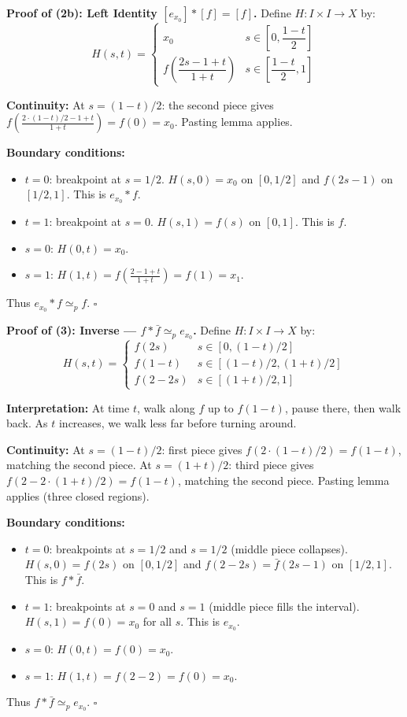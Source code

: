 \documentclass[11pt]{report}
\renewenvironment{proof}[1][Proof]{\noindent\textbf{#1.} }{\hfill$\square$\par\vspace{5pt}}
\begin{document}
\begin{proof}[{Proof of (2b): Left Identity $[e_{x_0}] * [f] = [f]$}]
Define $H: I \times I \to X$ by:
\[H(s, t) = \begin{cases} x_0 & s \in \left[0, \dfrac{1-t}{2}\right] \\[6pt] f\!\left(\dfrac{2s - 1 + t}{1 + t}\right) & s \in \left[\dfrac{1-t}{2}, 1\right] \end{cases}\]

\textbf{Continuity:} At $s = (1-t)/2$: the second piece gives $f\!\left(\frac{2 \cdot (1-t)/2 - 1 + t}{1+t}\right) = f(0) = x_0$. Pasting lemma applies.

\textbf{Boundary conditions:}
\begin{itemize}[nosep]
    \item $t = 0$: breakpoint at $s = 1/2$. $H(s, 0) = x_0$ on $[0, 1/2]$ and $f(2s - 1)$ on $[1/2, 1]$. This is $e_{x_0} * f$. \checkmark
    \item $t = 1$: breakpoint at $s = 0$. $H(s, 1) = f(s)$ on $[0, 1]$. This is $f$. \checkmark
    \item $s = 0$: $H(0, t) = x_0$. \checkmark
    \item $s = 1$: $H(1, t) = f\!\left(\frac{2 - 1 + t}{1 + t}\right) = f(1) = x_1$. \checkmark
\end{itemize}
Thus $e_{x_0} * f \simeq_p f$.
\end{proof}

\begin{proof}[Proof of (3): Inverse --- $f * \bar{f} \simeq_p e_{x_0}$]
Define $H: I \times I \to X$ by:
\[H(s, t) = \begin{cases} f(2s) & s \in [0, (1-t)/2] \\ f(1-t) & s \in [(1-t)/2, (1+t)/2] \\ f(2 - 2s) & s \in [(1+t)/2, 1] \end{cases}\]

\textbf{Interpretation:} At time $t$, walk along $f$ up to $f(1-t)$, pause there, then walk back. As $t$ increases, we walk less far before turning around.

\textbf{Continuity:} At $s = (1-t)/2$: first piece gives $f(2 \cdot (1-t)/2) = f(1-t)$, matching the second piece. At $s = (1+t)/2$: third piece gives $f(2 - 2 \cdot (1+t)/2) = f(1-t)$, matching the second piece. Pasting lemma applies (three closed regions).

\textbf{Boundary conditions:}
\begin{itemize}[nosep]
    \item $t = 0$: breakpoints at $s = 1/2$ and $s = 1/2$ (middle piece collapses). $H(s, 0) = f(2s)$ on $[0, 1/2]$ and $f(2 - 2s) = \bar{f}(2s - 1)$ on $[1/2, 1]$. This is $f * \bar{f}$. \checkmark
    \item $t = 1$: breakpoints at $s = 0$ and $s = 1$ (middle piece fills the interval). $H(s, 1) = f(0) = x_0$ for all $s$. This is $e_{x_0}$. \checkmark
    \item $s = 0$: $H(0, t) = f(0) = x_0$. \checkmark
    \item $s = 1$: $H(1, t) = f(2 - 2) = f(0) = x_0$. \checkmark
\end{itemize}
Thus $f * \bar{f} \simeq_p e_{x_0}$.
\end{proof}
\end{document}
